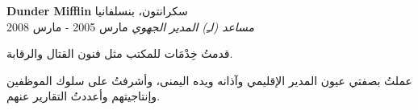 \foreignlanguage{english}{\textbf{Dunder Mifflin}} \hfill سكرانتون، بنسلفانيا\\
\textit{مساعد (لـِ) المدير الجهوي} \hfill مارس 2005 - مارس 2008\\
\vspace*{-4pt}
\begin{achievements}
	\item قدمتُ خِدْمَات للمكتب مثل فنون القتال والرقابة.
	\item عملتُ بصفتي عيون المدير الإقليمي وآذانه ويده اليمنى، وأشرفتُ على سلوك الموظفين وإنتاجيتهم وأعددتُ التقارير عنهم.
\end{achievements}
